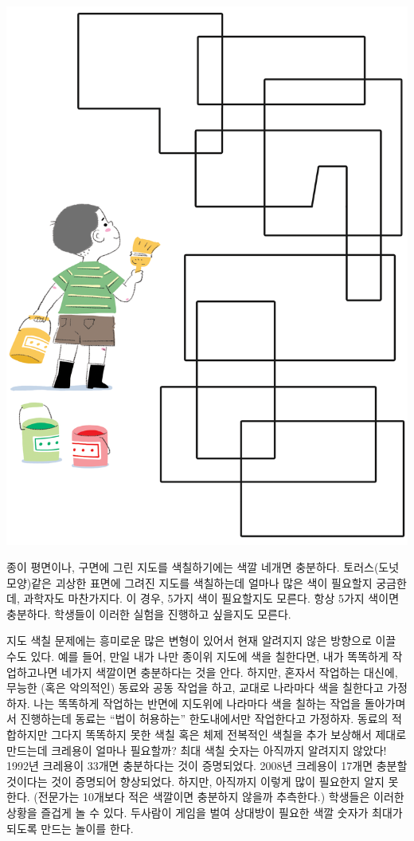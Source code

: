 \documentclass[]{article}
\begin{document}
\includegraphics{csunplugged/04-part/img/ch14-coloring/13-coloring-06-coloring-countries.png}

종이 평면이나, 구면에 그린 지도를 색칠하기에는 색깔 네개면 충분하다.
토러스(도넛 모양)같은 괴상한 표면에 그려진 지도를 색칠하는데 얼마나 많은
색이 필요할지 궁금한데, 과학자도 마찬가지다. 이 경우, 5가지 색이
필요할지도 모른다. 항상 5가지 색이면 충분하다. 학생들이 이러한 실험을
진행하고 싶을지도 모른다.

지도 색칠 문제에는 흥미로운 많은 변형이 있어서 현재 알려지지 않은
방향으로 이끌 수도 있다. 예를 들어, 만일 내가 나만 종이위 지도에 색을
칠한다면, 내가 똑똑하게 작업하고나면 네가지 색깔이면 충분하다는 것을
안다. 하지만, 혼자서 작업하는 대신에, 무능한 (혹은 악의적인) 동료와 공동
작업을 하고, 교대로 나라마다 색을 칠한다고 가정하자. 나는 똑똑하게
작업하는 반면에 지도위에 나라마다 색을 칠하는 작업을 돌아가며서
진행하는데 동료는 ``법이 허용하는'' 한도내에서만 작업한다고 가정하자.
동료의 적합하지만 그다지 똑똑하지 못한 색칠 혹은 체제 전복적인 색칠을
추가 보상해서 제대로 만드는데 크레용이 얼마나 필요할까? 최대 색칠 숫자는
아직까지 알려지지 않았다! 1992년 크레용이 33개면 충분하다는 것이
증명되었다. 2008년 크레용이 17개면 충분할 것이다는 것이 증명되어
향상되었다. 하지만, 아직까지 이렇게 많이 필요한지 알지 못한다. (전문가는
10개보다 적은 색깔이면 충분하지 않을까 추측한다.) 학생들은 이러한 상황을
즐겁게 놀 수 있다. 두사람이 게임을 벌여 상대방이 필요한 색깔 숫자가
최대가 되도록 만드는 놀이를 한다.
\end{document}
